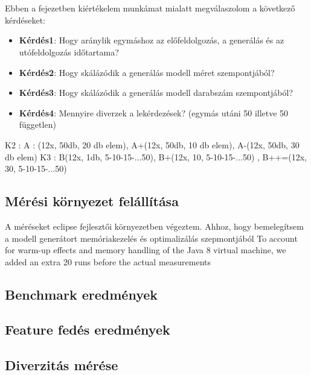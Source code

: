 \chapter{\evaluation}

Ebben a fejezetben kiértékelem munkámat mialatt megválaszolom a következő kérdéseket:

\begin{itemize}
	\item \textbf{Kérdés1}: Hogy aránylik egymáshoz az előfeldolgozás, a generálás és az utófeldolgozás időtartama?
	\item \textbf{Kérdés2}: Hogy skálázódik a generálás modell méret szempontjából?
	\item \textbf{Kérdés3}: Hogy skálázódik a generálás modell darabszám szempontjából?
	\item \textbf{Kérdés4}: Mennyire diverzek a lekérdezések? (egymás utáni 50 illetve 50 független) 
\end{itemize}


K2 : A : (12x, 50db, 20 db elem), A+(12x, 50db, 10 db elem), A-(12x, 50db, 30 db elem)
K3 : B(12x, 1db, 5-10-15-...50), B+(12x, 10, 5-10-15-...50) , B++=(12x, 30, 5-10-15-...50) 

\section{Mérési környezet felállítása}


A méréseket eclipse fejlesztői környezetben végeztem. Ahhoz, hogy bemelegítsem a modell generátort memóriakezelés és optimalizálás szepmontjából  
 To account
for warm-up effects and memory handling of the Java 8 virtual
machine, we added an extra 20 runs before the actual measurements



\section{Benchmark eredmények}
\section{Feature fedés eredmények} 

\section{Diverzitás mérése}